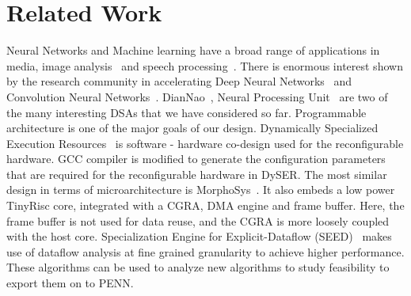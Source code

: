 \section{Related Work}\label{sec:related}
Neural Networks and Machine learning have a broad range of applications in media, image analysis~\cite{mnih2012learning} and speech processing~\cite{dahl2013improving}. There is enormous interest shown by the research community in accelerating Deep Neural Networks~\cite{hinton2012improving} and Convolution Neural Networks~\cite{le2013building}. DianNao~\cite{chen2014diannao}, Neural Processing Unit~\cite{esmaeilzadeh2012neural} are two of the many interesting DSAs that we have considered so far. 
Programmable architecture is one of the major goals of our design. Dynamically Specialized Execution Resources~\cite{govindaraju2012dyser} is software - hardware co-design used for the reconfigurable hardware. GCC compiler is modified to generate the configuration parameters that are required for the reconfigurable hardware in DySER.  
The most similar design in terms of microarchitecture is MorphoSys~\cite{singh2000morphosys}. It also embeds a low power TinyRisc core, integrated with a CGRA, DMA engine and frame buffer. Here, the frame buffer is not used for data reuse, and the CGRA is more loosely coupled with the host core. 
Specialization Engine for Explicit-Dataflow (SEED)~\cite{nowatzki2015exploring} makes use of dataflow analysis at fine grained granularity to achieve higher performance. These algorithms can be used to analyze new algorithms to study feasibility to export them on to PENN.


